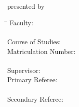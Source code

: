 \begin{titlepage}
\begin{figure}[h]
    
\end{figure}

\vfill
\vspace{10mm}

\large
\begin{center}

	\noindent { 
	 \color{uhhred}\textbf{\MakeUppercase \thesisType}
	}
	\vspace{2.0cm}\\
	\textbf{\Large \myTitle} 
	\vspace{2.0cm}\\ presented by
\vspace{0.4cm}\\
\myName
	
\end{center}
	
\vfill

\begin{tabbing}
	\hspace{10em} \=  \kill
	Faculty: \>  \faculty \\
	\> \fachbereich \\
	Course of Studies: \>  \courseOfStudies \\ %
	Matriculation Number: \>  \myMatNr \\ \\
	Supervisor: \> \supervisor \\
	Primary Referee: \> \primaryReferee \\
	 \>	\primaryRefereeInst \\
	Secondary Referee: \> \secondaryReferee \\
	 \>	\secondaryRefereeInst \\
\end{tabbing}


\newpage 
	
\thispagestyle{empty}
\setcounter{page}{0}

~\\ \vfill \noindent 
\optionalQuote

\end{titlepage}

\renewcommand{\cfttabpresnum}{Tab. } 
\renewcommand{\cftfigpresnum}{Fig. } 
\renewcommand{\nomname}{List of Abbreviations}
\renewcommand{\contentsname}{List of Contents}
\renewcommand{\listfigurename}{List of Figures}
\renewcommand{\listtablename}{List of Tables}
